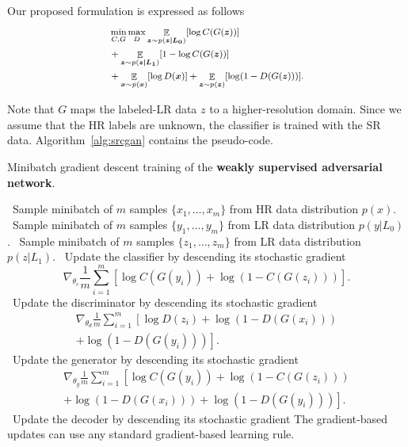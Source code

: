 \documentclass[10pt,twocolumn,letterpaper]{article}
\DeclareMathOperator*{\E}{\mathbb{E}}
\providecommand{\ve}[1]{{\bm{#1}}} %
\newcommand{\stateb}{\STATE \textbullet~}
\begin{document}
Our proposed formulation is expressed as follows
\begin{eqnarray}
\label{eq:srcgan}
\footnotesize
\begin{aligned}
& \min_{C,G} \max_D \E_{\ve{z} \sim p(\ve{z|L_0})}[\log C(G(\ve{z}))] \\ & +  \E_{\ve{z} \sim p(\ve{z|L_1})}[1-\log C(G(\ve{z}))] \\ & + \E_{\ve{x} \sim p(\ve{x})}[\log D(\ve{x})] + \E_{\ve{z} \sim p(\ve{z})}[\log (1 - D(G(\ve{z})))].
\end{aligned}
\end{eqnarray}


Note that $G$ maps the labeled-LR data $z$ to a higher-resolution domain. Since we assume that the HR labels are unknown, the classifier is trained with the SR data. Algorithm~\ref{alg:srcgan} contains the pseudo-code.

\begin{algorithm}[h!]
    \caption{Minibatch gradient descent training of the \textbf{weakly supervised adversarial network}.}
    \label{alg:srcgan}
    \begin{algorithmic}
    \stateb Sample minibatch of $m$ samples $\{x_1,\ldots, x_m\}$ from HR data distribution $p(x)$.
    \stateb Sample minibatch of $m$ samples $\{y_1,\ldots, y_m\}$ from LR data distribution $p(y|L_0)$.
    \stateb Sample minibatch of $m$ samples $\{z_1,\ldots, z_m\}$ from LR data distribution $p(z|L_1)$.
    \stateb Update the classifier by descending its stochastic gradient
    \[\nabla_{\theta_c} \frac{1}{m} \sum_{i=1}^m \left[\log C(G(y_i)) + \log(1 - C(G(z_i))) \right]. \]
    \stateb Update the discriminator by descending its stochastic gradient
    \[
    \begin{aligned}
    \nabla_{\theta_d} \frac{1}{m} \sum_{i=1}^m \left[\log D(z_i) + \log(1- D(G(x_i))) \right. \\ \left. + \log(1- D(G(y_i))) \right].
    \end{aligned}
    \]
    \stateb Update the generator by descending its stochastic gradient
    \[
    \begin{aligned}
    \nabla_{\theta_{g}} \frac{1}{m} \sum_{i=1}^m \left[\log C(G(y_i)) + \log(1 - C(G(z_i))) \right. \\ \left. + \log(1- D(G(x_i)))+\log(1- D(G(y_i))) \right].
    \end{aligned}
    \]
\stateb Update the decoder by descending its stochastic gradient
    \ENDFOR
    \STATE The gradient-based updates can use any standard gradient-based learning rule.
    \end{algorithmic}
\end{algorithm}
\end{document}
